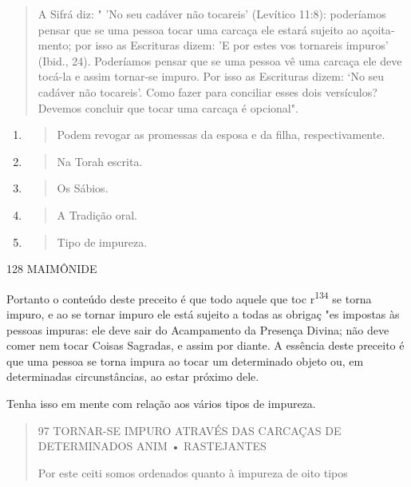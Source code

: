 \begin{quote}
A Sifrá diz: " 'No seu cadáver não tocareis' (Levítico 11:8):
podería­mos pensar que se uma pessoa tocar uma carcaça ele estará
sujeito ao açoita­mento; por isso as Escrituras dizem: 'E por estes vos
tornareis impuros' (Ibid., 24). Poderíamos pensar que se uma pessoa vê
uma carcaça ele deve tocá-la e assim tornar-se impuro. Por isso as
Escrituras dizem: `No seu cadáver não toca­reis'. Como fazer para
conciliar esses dois versículos? Devemos concluir que tocar uma carcaça
é opcional".
\end{quote}

\begin{enumerate}
\def\labelenumi{\arabic{enumi}.}
\setcounter{enumi}{128}
\item
  \begin{quote}
  Podem revogar as promessas da esposa e da filha, respectivamente.
  \end{quote}
\item
  \begin{quote}
  Na Torah escrita.
  \end{quote}
\item
  \begin{quote}
  Os Sábios.
  \end{quote}
\item
  \begin{quote}
  A Tradição oral.
  \end{quote}
\item
  \begin{quote}
  Tipo de impureza.
  \end{quote}
\end{enumerate}

128 MAIMÔNIDE

Portanto o conteúdo deste preceito é que todo aquele que toc
r\textsuperscript{134} se torna impuro, e ao se tornar impuro ele está
sujeito a todas as obrigaç "es impostas às pessoas impuras: ele deve
sair do Acampamento da Presença Divi­na; não deve comer nem tocar Coisas
Sagradas, e assim por diante. A essência deste preceito é que uma pessoa
se torna impura ao tocar um determinado ob­jeto ou, em determinadas
circunstâncias, ao estar próximo dele.

Tenha isso em mente com relação aos vários tipos de impureza.

\begin{quote}
97 TORNAR-SE IMPURO ATRAVÉS DAS CARCAÇAS DE DETERMINADOS ANIM •
RASTEJANTES

Por este ceiti somos ordenados quanto à impureza de oito tipos
\end{quote}

